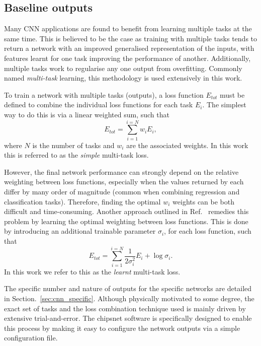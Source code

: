 \subsection{Baseline outputs} %
\label{sec:cnn_baseline_outputs} %

Many CNN applications are found to benefit from learning multiple tasks at the same time. This is
believed to be the case as training with multiple tasks tends to return a network with an improved
generalised representation of the inputs, with features learnt for one task improving the
performance of another. Additionally, multiple tasks work to regularise any one output from
overfitting. Commonly named \emph{multi-task} learning, this methodology is used extensively in
this work.

To train a network with multiple tasks (outputs), a loss function $E_{tot}$ must be defined to
combine the individual loss functions for each task $E_{i}$. The simplest way to do this is via a
linear weighted sum, such that
\begin{equation}
    E_{tot} = \sum_{i=1}^{i=N}w_{i}E_{i},
    \label{eq:multi_simple}
\end{equation}
where $N$ is the number of tasks and $w_{i}$ are the associated weights. In this work this is
referred to as the \emph{simple} multi-task loss.

However, the final network performance can strongly depend on the relative weighting between loss
functions, especially when the values returned by each differ by many order of magnitude (common
when combining regression and classification tasks). Therefore, finding the optimal $w_{i}$
weights can be both difficult and time-consuming. Another approach outlined in
Ref.~\cite{kendall2018} remedies this problem by learning the optimal weighting between loss
functions. This is done by introducing an additional trainable parameter $\sigma_{i}$, for each
loss function, such that
\begin{equation}
    E_{tot}= \sum_{i=1}^{i=N}\frac{1}{2\sigma_{i}^2}E_{i}+ \log\sigma_{i}.
    \label{eq:multi_learnt}
\end{equation}
In this work we refer to this as the \emph{learnt} multi-task loss.

The specific number and nature of outputs for the specific networks are detailed in
Section.~\ref{sec:cnn_specific}. Although physically motivated to some degree, the exact set of
tasks and the loss combination technique used is mainly driven by extensive trial-and-error. The
chipsnet software is specifically designed to enable this process by making it easy to configure
the network outputs via a simple configuration file.

